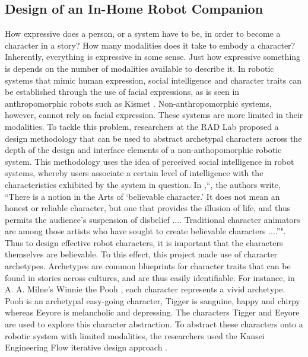\documentclass[arts,article,submit,moreauthors,pdftex,10pt,a4paper]{mdpi}
\begin{document}
\subsection{Design of an In-Home Robot Companion}
How expressive does a person, or a system have to be, in order to become a character in a story? How many modalities does it take to embody a character? Inherently, everything is expressive in some sense. Just how expressive something is depends on the number of modalities available to describe it. In robotic systems that mimic human expression, social intelligence and character traits can be established through the use of facial expressions, as is seen in anthropomorphic robots such as Kismet \cite{breazeal2003emotion}. Non-anthropomorphic systems, however, cannot rely on facial expression. These systems are more limited in their modalities. To tackle this problem, researchers at the RAD Lab proposed a design methodology that can be used to abstract archetypal characters across the depth of the design and interface elements of a non-anthopomorphic robotic system. This methodology uses the idea of perceived social intelligence in robot systems, whereby users associate a certain level of intelligence with the characteristics exhibited by the system in question. In \cite{bates1994role},{``}, the authors write, “There is a notion in the Arts of {`}believable character.{'} It does not mean an honest or reliable character, but one that provides the illusion of life, and thus permits the audience{'}s suspension of disbelief .... Traditional character animators are among those artists who have sought to create believable characters ....”{"}. Thus to design effective robot characters, it is important that the characters themselves are believable. To this effect, this project made use of character archetypes. Archetypes are common blueprints for character traits that can be found in stories across cultures, and are thus easily identifiable. For instance, in A. A. Milne's Winnie the Pooh \cite{milne1977world}, each character represents a vivid archetype. Pooh is an archetypal easy-going character, Tigger is sanguine, happy and chirpy whereas Eeyore is melancholic and depressing. The characters Tigger and Eeyore are used to explore this character abstraction. To abstract these characters onto a robotic system with limited modalities, the researchers used the Kansei Engineering Flow iterative design approach \cite{nagamachi1995kansei}.
\end{document}
